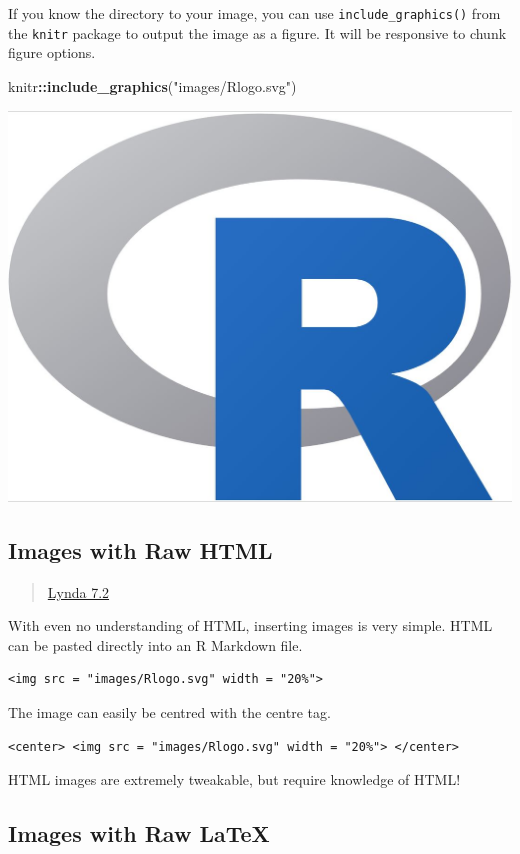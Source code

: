 \documentclass[]{article}
\newenvironment{Shaded}{\begin{snugshade}}{\end{snugshade}}
\newcommand{\KeywordTok}[1]{\textcolor[rgb]{0.13,0.29,0.53}{\textbf{#1}}}
\newcommand{\NormalTok}[1]{#1}
\newcommand{\OperatorTok}[1]{\textcolor[rgb]{0.81,0.36,0.00}{\textbf{#1}}}
\newcommand{\StringTok}[1]{\textcolor[rgb]{0.31,0.60,0.02}{#1}}
\begin{document}
If you know the directory to your image, you can use
\texttt{include\_graphics()} from the \texttt{knitr} package to output
the image as a figure. It will be responsive to chunk figure options.

\begin{Shaded}
\begin{Highlighting}[]
\NormalTok{knitr}\OperatorTok{::}\KeywordTok{include_graphics}\NormalTok{(}\StringTok{"images/Rlogo.svg"}\NormalTok{)}
\end{Highlighting}
\end{Shaded}

\begin{center}\includegraphics[width=0.2\linewidth]{images/Rlogo} \end{center}

\hypertarget{images-with-raw-html}{%
\subsection{Images with Raw HTML}\label{images-with-raw-html}}

\begin{quote}
\href{https://www.lynda.com/RStudio-tutorials/Inserting-images-using-raw-HTML/699348/2800216-4.html?srchtrk=index\%3a1\%0alinktypeid\%3a2\%0aq\%3ar+markdown\%0apage\%3a1\%0as\%3arelevance\%0asa\%3atrue\%0aproducttypeid\%3a2}{Lynda
7.2}
\end{quote}

With even no understanding of HTML, inserting images is very simple.
HTML can be pasted directly into an R Markdown file.

\begin{verbatim}
<img src = "images/Rlogo.svg" width = "20%">
\end{verbatim}

The image can easily be centred with the centre tag.

\begin{verbatim}
<center> <img src = "images/Rlogo.svg" width = "20%"> </center>
\end{verbatim}

HTML images are extremely tweakable, but require knowledge of HTML!

\hypertarget{images-with-raw-latex}{%
\subsection{Images with Raw LaTeX}\label{images-with-raw-latex}}
\end{document}
